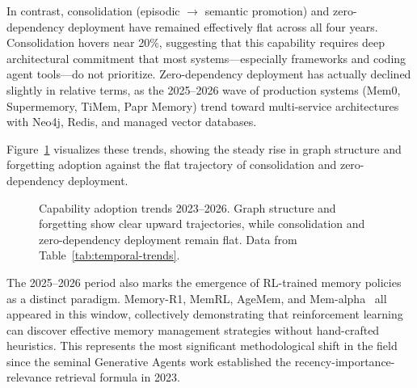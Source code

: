 In contrast, consolidation (episodic $\to$ semantic promotion) and
zero-dependency deployment have remained effectively flat across all four
years. Consolidation hovers near 20\%, suggesting that this capability
requires deep architectural commitment that most systems---especially
frameworks and coding agent tools---do not prioritize. Zero-dependency
deployment has actually declined slightly in relative terms, as the
2025--2026 wave of production systems (Mem0, Supermemory, TiMem, Papr
Memory) trend toward multi-service architectures with Neo4j, Redis, and
managed vector databases.

Figure~\ref{fig:temporal} visualizes these trends, showing the steady
rise in graph structure and forgetting adoption against the flat
trajectory of consolidation and zero-dependency deployment.

\begin{figure}[!t]
\centering
{}
\caption{Capability adoption trends 2023--2026.  Graph structure and
forgetting show clear upward trajectories, while consolidation and
zero-dependency deployment remain flat.  Data from
Table~\ref{tab:temporal-trends}.}
\label{fig:temporal}
\end{figure}

The 2025--2026 period also marks the emergence of RL-trained memory
policies as a distinct paradigm. Memory-R1, MemRL, AgeMem, and
Mem-alpha~\cite{wang2025memalpha} all appeared in this window, collectively
demonstrating that reinforcement learning can discover effective memory
management strategies without hand-crafted heuristics. This represents the
most significant methodological shift in the field since the seminal
Generative Agents work \cite{park2023generative} established the
recency-importance-relevance retrieval formula in 2023.

